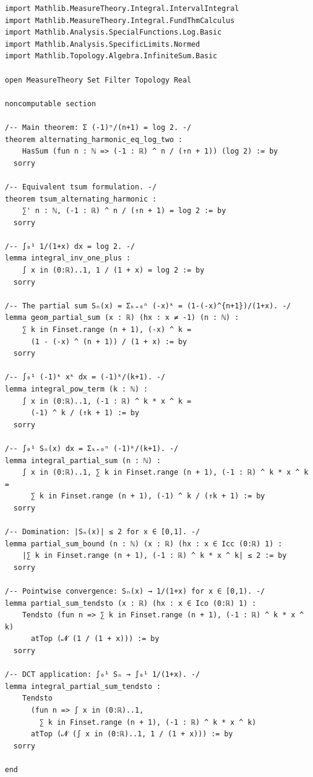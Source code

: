 \documentclass[
]{article}
\begin{document}
\begin{verbatim}
import Mathlib.MeasureTheory.Integral.IntervalIntegral
import Mathlib.MeasureTheory.Integral.FundThmCalculus
import Mathlib.Analysis.SpecialFunctions.Log.Basic
import Mathlib.Analysis.SpecificLimits.Normed
import Mathlib.Topology.Algebra.InfiniteSum.Basic

open MeasureTheory Set Filter Topology Real

noncomputable section

/-- Main theorem: Σ (-1)ⁿ/(n+1) = log 2. -/
theorem alternating_harmonic_eq_log_two :
    HasSum (fun n : ℕ => (-1 : ℝ) ^ n / (↑n + 1)) (log 2) := by
  sorry

/-- Equivalent tsum formulation. -/
theorem tsum_alternating_harmonic :
    ∑' n : ℕ, (-1 : ℝ) ^ n / (↑n + 1) = log 2 := by
  sorry

/-- ∫₀¹ 1/(1+x) dx = log 2. -/
lemma integral_inv_one_plus :
    ∫ x in (0:ℝ)..1, 1 / (1 + x) = log 2 := by
  sorry

/-- The partial sum Sₙ(x) = Σₖ₌₀ⁿ (-x)ᵏ = (1-(-x)^{n+1})/(1+x). -/
lemma geom_partial_sum (x : ℝ) (hx : x ≠ -1) (n : ℕ) :
    ∑ k in Finset.range (n + 1), (-x) ^ k =
      (1 - (-x) ^ (n + 1)) / (1 + x) := by
  sorry

/-- ∫₀¹ (-1)ᵏ xᵏ dx = (-1)ᵏ/(k+1). -/
lemma integral_pow_term (k : ℕ) :
    ∫ x in (0:ℝ)..1, (-1 : ℝ) ^ k * x ^ k =
      (-1) ^ k / (↑k + 1) := by
  sorry

/-- ∫₀¹ Sₙ(x) dx = Σₖ₌₀ⁿ (-1)ᵏ/(k+1). -/
lemma integral_partial_sum (n : ℕ) :
    ∫ x in (0:ℝ)..1, ∑ k in Finset.range (n + 1), (-1 : ℝ) ^ k * x ^ k =
      ∑ k in Finset.range (n + 1), (-1) ^ k / (↑k + 1) := by
  sorry

/-- Domination: |Sₙ(x)| ≤ 2 for x ∈ [0,1]. -/
lemma partial_sum_bound (n : ℕ) (x : ℝ) (hx : x ∈ Icc (0:ℝ) 1) :
    |∑ k in Finset.range (n + 1), (-1 : ℝ) ^ k * x ^ k| ≤ 2 := by
  sorry

/-- Pointwise convergence: Sₙ(x) → 1/(1+x) for x ∈ [0,1). -/
lemma partial_sum_tendsto (x : ℝ) (hx : x ∈ Ico (0:ℝ) 1) :
    Tendsto (fun n => ∑ k in Finset.range (n + 1), (-1 : ℝ) ^ k * x ^ k)
      atTop (𝓝 (1 / (1 + x))) := by
  sorry

/-- DCT application: ∫₀¹ Sₙ → ∫₀¹ 1/(1+x). -/
lemma integral_partial_sum_tendsto :
    Tendsto
      (fun n => ∫ x in (0:ℝ)..1,
        ∑ k in Finset.range (n + 1), (-1 : ℝ) ^ k * x ^ k)
      atTop (𝓝 (∫ x in (0:ℝ)..1, 1 / (1 + x))) := by
  sorry

end
\end{verbatim}
\end{document}
